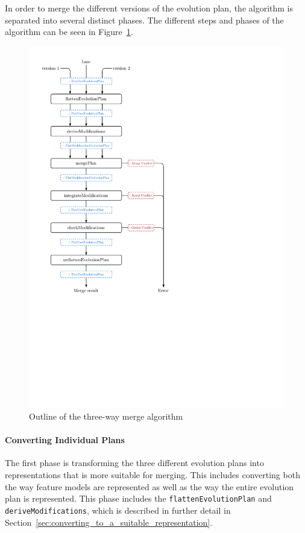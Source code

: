 \documentclass[a4paper,english]{ifimaster}
\begin{document}
In order to merge the different versions of the evolution plan, the algorithm is separated into several distinct phases. The different steps and phases of the algorithm can be seen in Figure~\ref{fig:merge_outline}.

\begin{figure}[htbp]
  \centering
  \includegraphics[width=0.8\linewidth]{merge_outline}
  \caption{Outline of the three-way merge algorithm}%
  \label{fig:merge_outline}
\end{figure}

\paragraph{Converting Individual Plans}%
\label{par:converting_individual_plans}

The first phase is transforming the three different evolution plans into representations that is more suitable for merging. This includes converting both the way feature models are represented as well as the way the entire evolution plan is represented. This phase includes the \texttt{flatten\-Evolution\-Plan} and \texttt{derive\-Modifications}, which is described in further detail in Section~\vref{sec:converting_to_a_suitable_representation}.
\end{document}
